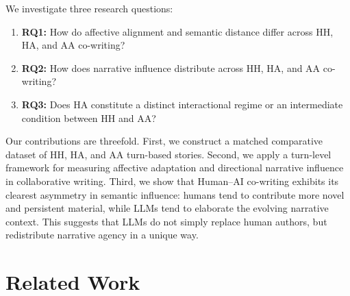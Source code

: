 \documentclass[11pt]{article}
\begin{document}
We investigate three research questions:

\begin{enumerate}
    \item \textbf{RQ1:} How do affective alignment and semantic distance differ across HH, HA, and AA co-writing?
    \item \textbf{RQ2:} How does narrative influence distribute across HH, HA, and AA co-writing?
    \item \textbf{RQ3:} Does HA constitute a distinct interactional regime or an intermediate condition between HH and AA?
\end{enumerate}

Our contributions are threefold. First, we construct a matched comparative dataset of HH, HA, and AA turn-based stories. Second, we apply a turn-level framework for measuring affective adaptation and directional narrative influence in collaborative writing. Third, we show that Human--AI co-writing exhibits its clearest asymmetry in semantic influence: humans tend to contribute more novel and persistent material, while LLMs tend to elaborate the evolving narrative context. This suggests that LLMs do not simply replace human authors, but redistribute narrative agency in a unique way.

\section{Related Work}
\end{document}
